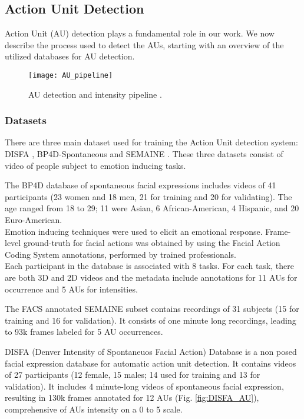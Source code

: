 \subsection{Action Unit Detection}
Action Unit (AU) detection plays a fundamental role in our work. We now describe the process used to detect the AUs, starting with an overview of the utilized databases for AU detection.

\begin{figure}[H]
	\centering
	\texttt{[image: AU\_pipeline]}
	\caption{AU detection and intensity pipeline \cite{Baltru2015}.}
	\label{fig:AU_pipeline}
\end{figure}

\subsubsection{Datasets}
There are three main dataset used for training the Action Unit detection system: DISFA \cite{DISFA}, BP4D-Spontaneous \cite{BP4D-Spontaneous} and SEMAINE \cite{SEMAINE}. These three datasets consist of video of people subject to emotion inducing tasks.

The BP4D database of spontaneous facial expressions includes videos of 41 participants (23 women and 18 men, 21 for training and 20 for validating). The age ranged from 18 to 29; 11 were Asian, 6 African-American, 4 Hispanic, and 20 Euro-American. \\
Emotion inducing techniques were used to elicit an emotional response. Frame-level ground-truth for facial actions was obtained by using the Facial Action Coding System annotations, performed by trained professionals. \\
Each participant in the database is associated with 8 tasks. For each task, there are both 3D and 2D videos and the metadata include annotations for 11 AUs for occurrence and 5 AUs for intensities.

The FACS annotated SEMAINE subset contains recordings of 31 subjects (15 for training and 16 for validation). It consists of one minute long recordings, leading to 93k frames labeled for 5 AU occurrences.

DISFA (Denver Intensity of Spontaneuos Facial Action) Database is a non posed facial expression database for automatic action unit detection. It contains videos of 27 participants (12 female, 15 males; 14 used for training and 13 for validation). It includes 4 minute-long videos of spontaneous facial expression, resulting in 130k frames annotated for 12 AUs (Fig. \ref{fig:DISFA_AU}), comprehensive of AUs intensity on a 0 to 5 scale.


